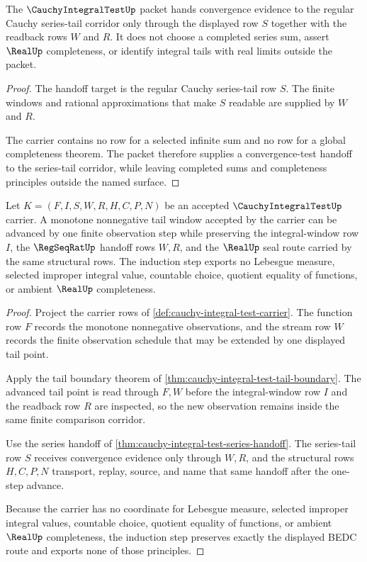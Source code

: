 \begin{theorem}
\label{thm:cauchy-integral-test-series-handoff}
The $\CauchyIntegralTestUp$ packet hands convergence evidence to the regular Cauchy series-tail corridor only through the displayed row $S$ together with the readback rows $W$ and $R$. It does not choose a completed series sum, assert $\RealUp$ completeness, or identify integral tails with real limits outside the packet.
\end{theorem}
\begin{proof}
The handoff target is the regular Cauchy series-tail row $S$. The finite windows and rational approximations that make $S$ readable are supplied by $W$ and $R$.

The carrier contains no row for a selected infinite sum and no row for a global completeness theorem. The packet therefore supplies a convergence-test handoff to the series-tail corridor, while leaving completed sums and completeness principles outside the named surface.
\end{proof}

\begin{theorem}
\label{thm:cauchy-integral-test-monotone-tail-induction}
Let $K=(F,I,S,W,R,H,C,P,N)$ be an accepted $\CauchyIntegralTestUp$ carrier. A monotone nonnegative tail window accepted by the carrier can be advanced by one finite observation step while preserving the integral-window row $I$, the $\RegSeqRatUp$ handoff rows $W,R$, and the $\RealUp$ seal route carried by the same structural rows. The induction step exports no Lebesgue measure, selected improper integral value, countable choice, quotient equality of functions, or ambient $\RealUp$ completeness.
\end{theorem}
\begin{proof}
Project the carrier rows of \autoref{def:cauchy-integral-test-carrier}. The function row $F$ records the monotone nonnegative observations, and the stream row $W$ records the finite observation schedule that may be extended by one displayed tail point.

Apply the tail boundary theorem of \autoref{thm:cauchy-integral-test-tail-boundary}. The advanced tail point is read through $F,W$ before the integral-window row $I$ and the readback row $R$ are inspected, so the new observation remains inside the same finite comparison corridor.

Use the series handoff of \autoref{thm:cauchy-integral-test-series-handoff}. The series-tail row $S$ receives convergence evidence only through $W,R$, and the structural rows $H,C,P,N$ transport, replay, source, and name that same handoff after the one-step advance.

Because the carrier has no coordinate for Lebesgue measure, selected improper integral values, countable choice, quotient equality of functions, or ambient $\RealUp$ completeness, the induction step preserves exactly the displayed BEDC route and exports none of those principles.
\end{proof}

